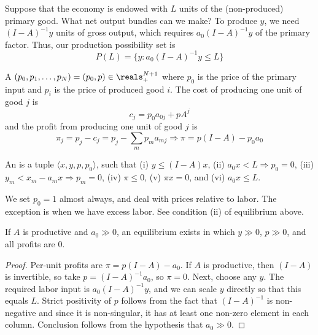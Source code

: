 \documentclass[10pt]{article}
\begin{document}
Suppose that the economy is endowed with $L$ units of the (non-produced) primary good. What net output bundles can we make? To produce $y$, we need $(I-A)^{-1}y$ units of gross output, which requires $a_0 (I-A)^{-1}y$ of the primary factor. Thus, our production possibility set is \[P(L) = \{y : a_0 (I-A)^{-1}y \le L\}\]

\begin{definition}
	A  $(p_0,p_1,\dots,p_N) = (p_0,p) \in \reals_+^{N+1}$ where $p_0$ is the price of the primary input and $p_i$ is the price of produced good $i$. The cost of producing one unit of good $j$ is \[c_j = p_0a_{0j} + pA^j\]and the profit from producing one unit of good $j$ is \[\pi_j = p_j - c_j = p_j - \sum_{m} p_ma_{mj}\Longrightarrow \pi = p(I-A) - p_0a_0\]
\end{definition}

\begin{definition}
	An  is a tuple $\langle x, y, p, p_0\rangle$, such that (i) $y \le (I-A)x$, (ii) $a_0x < L \Longrightarrow p_0 = 0$, (iii) $y_m < x_m - a_m x \Longrightarrow p_m = 0$, (iv) $\pi \le 0$, (v) $\pi x = 0$, and (vi) $a_0 x \le L$.
\end{definition}
\begin{assumption}
	We set $p_0 = 1$ almost always, and deal with prices relative to labor. The exception is when we have excess labor. See condition \textnormal{(ii)} of equilibrium above.
\end{assumption}

\begin{theorem}
	If $A$ is productive and $a_0 \gg 0$, an equilibrium exists in which $y \gg 0$, $p \gg 0$, and all profits are 0.
\end{theorem}
\begin{proof}
	Per-unit profits are $\pi = p(I-A) - a_0$. If $A$ is productive, then $(I-A)$ is invertible, so take $p = (I-A)^{-1}a_0$, so $\pi =0$. Next, choose any $y$. The required labor input is $a_0 (I-A)^{-1}y$, and we can scale $y$ directly so that this equals $L$. Strict positivity of $p$ follows from the fact that $(I-A)^{-1}$ is non-negative and since it is non-singular, it has at least one non-zero element in each column. Conclusion follows from the hypothesis that $a_0 \gg 0$.
\end{proof}
\end{document}
